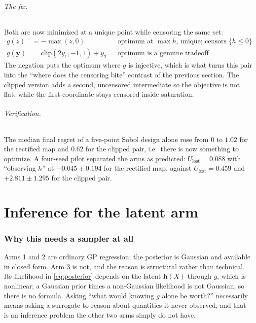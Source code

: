 \documentclass[11pt]{article}
\newcommand{\Ulost}{U_{\text{lost}}}
\begin{document}
\paragraph{The fix.} Both are now minimized at a unique point while censoring the
same set:
\begin{align}
g(z)&=-\max(z,0) && \text{optimum at }\max h\text{, unique; censors }\{h\le0\}\\
g(\mathbf{y})&=\mathrm{clip}(2y_1,-1,1)+y_2 && \text{optimum is a genuine tradeoff}
\end{align}
The negation puts the optimum where $g$ is injective, which is what turns this
pair into the ``where does the censoring bite'' contrast of the previous section.
The clipped version adds a second, uncensored intermediate so the objective is
not flat, while the first coordinate stays censored inside saturation.

\paragraph{Verification.} The median final regret of a five-point Sobol design
alone rose from $0$ to $1.02$ for the rectified map and $0.62$ for the clipped
pair, i.e.\ there is now something to optimize. A four-seed pilot separated the
arms as predicted: $\Ulost=0.088$ with ``observing $h$'' at $-0.045\pm0.194$ for
the rectified map, against $\Ulost=0.459$ and $+2.811\pm1.295$ for the clipped
pair.

\part{Inference for the latent arm}
\label{part:latent}

\section{Why this needs a sampler at all}

Arms 1 and 2 are ordinary GP regression: the posterior is Gaussian and available
in closed form. Arm 3 is not, and the reason is structural rather than technical.
Its likelihood in \eqref{eq:posterior} depends on the latent $\mathbf{h}(X)$
through $g$, which is nonlinear; a Gaussian prior times a non-Gaussian
likelihood is not Gaussian, so there is no formula. Asking ``what would knowing
$g$ alone be worth?'' necessarily means asking a surrogate to reason about
quantities it never observed, and that is an inference problem the other two arms
simply do not have.
\end{document}
